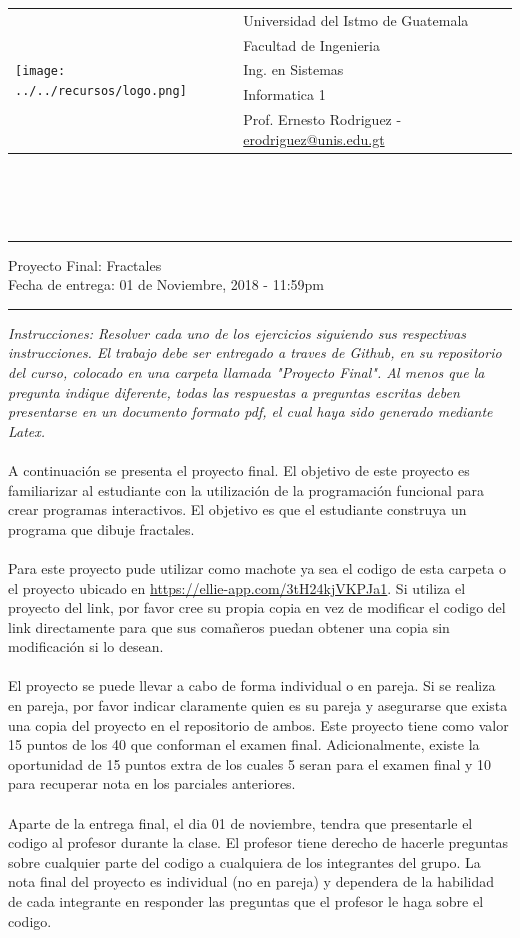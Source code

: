 \documentclass{article}
\newcommand{\horrule}[1]{\rule{\linewidth}{#1}}
\begin{document}
\begin{tabular}{l l}
\multirow{5}{*}{\texttt{[image: ../../recursos/logo.png]}} & Universidad del Istmo de Guatemala \\
 & Facultad de Ingenieria \\
 & Ing. en Sistemas \\
 & Informatica 1 \\
 & Prof. Ernesto Rodriguez - \href{mailto:erodriguez@unis.edu.gt}{erodriguez@unis.edu.gt} \\
\end{tabular}
\\\\\\

\begin{center}
        \horrule{0.5pt}
        \huge{Proyecto Final: Fractales} \\
        \large{Fecha de entrega: 01 de Noviembre, 2018 - 11:59pm} \\
        \horrule{1pt}
\end{center}

\emph{Instrucciones: Resolver cada uno de los ejercicios siguiendo sus respectivas
instrucciones. El trabajo debe ser entregado a traves de Github, en su repositorio del curso, colocado en una carpeta llamada "Proyecto Final".
Al menos que la pregunta indique diferente, todas las respuestas a preguntas escritas deben presentarse en
un documento formato pdf, el cual haya sido generado mediante Latex. }
\\\\
A continuaci\'on se presenta el proyecto final. El objetivo de este proyecto es familiarizar al
estudiante con la utilizaci\'on de la programaci\'on funcional para crear programas interactivos.
El objetivo es que el estudiante construya un programa que dibuje fractales.
\\\\
Para este proyecto pude utilizar como machote ya sea el codigo de esta carpeta o el proyecto
ubicado en \url{https://ellie-app.com/3tH24kjVKPJa1}. Si utiliza el proyecto del link, por favor
cree su propia copia en vez de modificar el codigo del link directamente para que sus coma\~neros
puedan obtener una copia sin modificaci\'on si lo desean.
\\\\
El proyecto se puede llevar a cabo de forma individual o en pareja. Si se realiza en pareja,
por favor indicar claramente quien es su pareja y asegurarse que exista una copia del proyecto
en el repositorio de ambos. Este proyecto tiene como valor 15 puntos de los 40 que conforman
el examen final. Adicionalmente, existe la oportunidad de 15 puntos extra de los cuales 5
seran para el examen final y 10 para recuperar nota en los parciales anteriores.
\\\\
Aparte de la entrega final, el dia 01 de noviembre, tendra que presentarle el codigo
al profesor durante la clase. El profesor tiene derecho de hacerle preguntas sobre
cualquier parte del codigo a cualquiera de los integrantes del grupo. La nota final
del proyecto es individual (no en pareja) y dependera de la habilidad de cada integrante
en responder las preguntas que el profesor le haga sobre el codigo.
\end{document}
